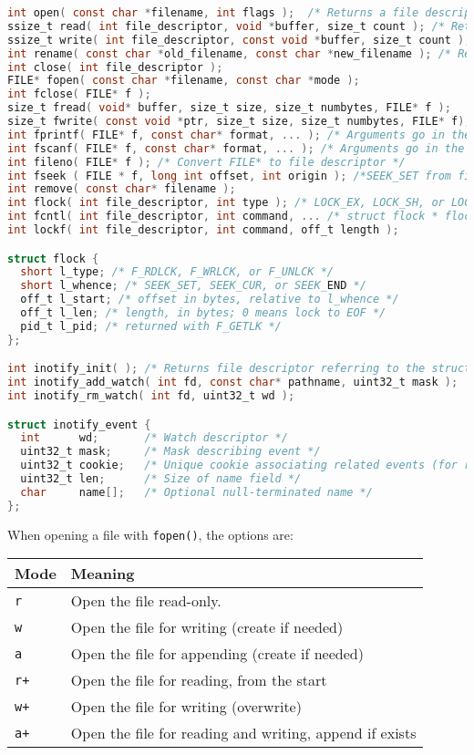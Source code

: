 \documentclass[legalpaper,10pt]{article}
\begin{document}
\begin{lstlisting}[language=C]
int open( const char *filename, int flags );  /* Returns a file descriptor if successful, -1 on error */
ssize_t read( int file_descriptor, void *buffer, size_t count ); /* Returns number of bytes read */
ssize_t write( int file_descriptor, const void *buffer, size_t count ); /* Returns number of bytes written */
int rename( const char *old_filename, const char *new_filename ); /* Returns 0 on success */
int close( int file_descriptor ); 
FILE* fopen( const char *filename, const char *mode );
int fclose( FILE* f );
size_t fread( void* buffer, size_t size, size_t numbytes, FILE* f );
size_t fwrite( const void *ptr, size_t size, size_t numbytes, FILE* f);
int fprintf( FILE* f, const char* format, ... ); /* Arguments go in the ...  */
int fscanf( FILE* f, const char* format, ... ); /* Arguments go in the ...  */
int fileno( FILE* f ); /* Convert FILE* to file descriptor */
int fseek ( FILE * f, long int offset, int origin ); /*SEEK_SET from file start. SEEK_CUR from current loc.*/
int remove( const char* filename );
int flock( int file_descriptor, int type ); /* LOCK_EX, LOCK_SH, or LOCK_UN for type */
int fcntl( int file_descriptor, int command, ... /* struct flock * flockptr */ );
int lockf( int file_descriptor, int command, off_t length );

struct flock {
  short l_type; /* F_RDLCK, F_WRLCK, or F_UNLCK */
  short l_whence; /* SEEK_SET, SEEK_CUR, or SEEK_END */
  off_t l_start; /* offset in bytes, relative to l_whence */ 
  off_t l_len; /* length, in bytes; 0 means lock to EOF */ 
  pid_t l_pid; /* returned with F_GETLK */
};

int inotify_init( ); /* Returns file descriptor referring to the struct */ 
int inotify_add_watch( int fd, const char* pathname, uint32_t mask );
int inotify_rm_watch( int fd, uint32_t wd );

struct inotify_event {
  int      wd;       /* Watch descriptor */
  uint32_t mask;     /* Mask describing event */
  uint32_t cookie;   /* Unique cookie associating related events (for rename(2)) */  
  uint32_t len;      /* Size of name field */
  char     name[];   /* Optional null-terminated name */
};

\end{lstlisting}

When opening a file with \texttt{fopen()}, the options are:\\
\begin{tabular}{l|l}
	\textbf{Mode} & \textbf{Meaning} \\ \hline
	\texttt{r} & Open the file read-only. \\ \hline
	\texttt{w} & Open the file for writing (create if needed) \\ \hline
	\texttt{a} & Open the file for appending (create if needed) \\ \hline
	\texttt{r+} & Open the file for reading, from the start \\ \hline
	\texttt{w+} & Open the file for writing (overwrite) \\ \hline
	\texttt{a+} & Open the file for reading and writing, append if exists \\
\end{tabular}
\end{document}
